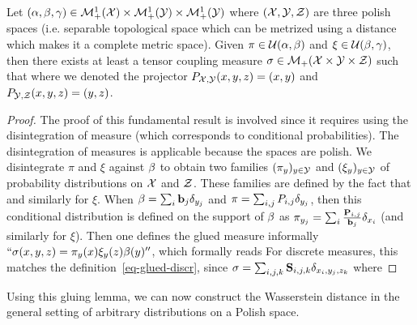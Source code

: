 \begin{lem}\label{lem-gluing-general}
	Let $(\alpha,\beta,\gamma) \in \mathcal{M}_+^1(\mathcal{X}) \times \mathcal{M}_+^1(\mathcal{Y}) \times \mathcal{M}_+^1(\mathcal{Y})$
	where $(\mathcal{X},\mathcal{Y},\mathcal{Z})$ are three polish spaces (i.e. separable topological space which can be metrized using a distance which makes it a complete metric space).  
	Given $\pi \in \mathcal{U}(\alpha,\beta)$ and $\xi \in \mathcal{U}(\beta,\gamma)$, then there exists at least a tensor coupling measure
	$\sigma \in \mathcal{M}_+(\mathcal{X} \times \mathcal{Y} \times \mathcal{Z})$ such that 
	where we denoted the projector $P_{\mathcal{X},\mathcal{Y}}(x,y,z)=(x,y)$ and $P_{\mathcal{Y},\mathcal{Z}}(x,y,z)=(y,z)$. 
\end{lem}
\begin{proof}
	The proof of this fundamental result is involved since it requires using the disintegration of measure (which corresponds to conditional probabilities). 
	The disintegration of measures is applicable because the spaces are polish. 
	We disintegrate $\pi$ and $\xi$ against $\beta$ to obtain two families $(\pi_y)_{y \in \mathcal{Y}}$ and $(\xi_y)_{y \in \mathcal{Y}}$ of probability distributions on $\mathcal{X}$ and $\mathcal{Z}$. These families are defined by the fact that 
	and similarly for $\xi$.
	When $\beta=\sum_i \mathrm{\textbf{\upshape b}}_j \delta_{y_j}$ and $\pi=\sum_{i,j}P_{i,j} \delta_{y_j}$, then this conditional distribution is defined on the support of $\beta$ as
	$\pi_{y_j} = \sum_i \frac{\mathrm{\textbf{\upshape P}}_{i,j}}{\mathrm{\textbf{\upshape b}}_j} \delta_{x_i}$ (and similarly for $\xi$).
	Then one defines the glued measure informally $``\sigma(x,y,z) = \pi_y(x) \xi_y(z) \beta(y)''$, which formally reads
	For discrete measures, this matches the definition~\eqref{eq-glued-discr}, since $\sigma=\sum_{i,j,k} \mathrm{\textbf{\upshape S}}_{i,j,k} \delta_{x_i,y_j,z_k}$ where
\end{proof}

Using this gluing lemma, we can now construct the Wasserstein distance in the general setting of arbitrary distributions on a Polish space.

